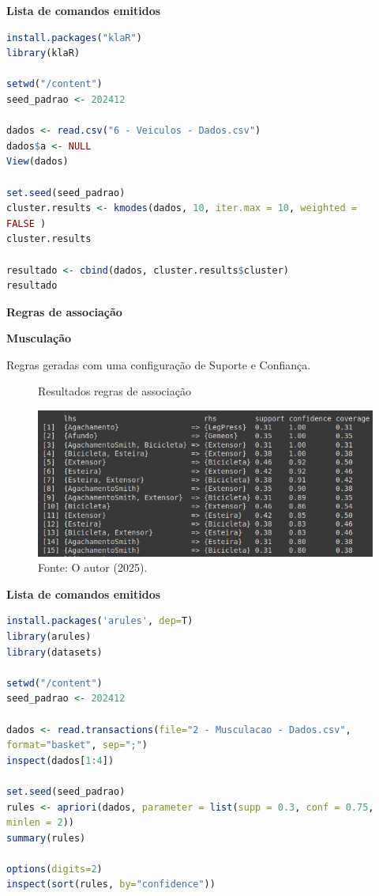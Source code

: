 \begin{center}
    \textbf{Lista de comandos emitidos}
\end{center}


\begin{lstlisting}[language=R, style=input]
install.packages("klaR")
library(klaR)

setwd("/content")
seed_padrao <- 202412

dados <- read.csv("6 - Veiculos - Dados.csv")
dados$a <- NULL
View(dados)

set.seed(seed_padrao)
cluster.results <- kmodes(dados, 10, iter.max = 10, weighted =
FALSE )
cluster.results

resultado <- cbind(dados, cluster.results$cluster)
resultado
\end{lstlisting}


\begin{adjustwidth}{1em}{}
\textbf{Regras de associação}
\end{adjustwidth}

\begin{center}
    \textbf{Musculação}
\end{center}

Regras geradas com uma configuração de Suporte e Confiança.


\begin{figure}[H]
\centering
\caption{Resultados regras de associação}
\includegraphics[width=\linewidth]{apendices/fig/8_IAA008_17.png}
\caption*{Fonte: O autor (2025).}
\end{figure}

\begin{center}
    \textbf{Lista de comandos emitidos}
\end{center}


\begin{lstlisting}[language=R, style=input]
install.packages('arules', dep=T)
library(arules)
library(datasets)

setwd("/content")
seed_padrao <- 202412

dados <- read.transactions(file="2 - Musculacao - Dados.csv",
format="basket", sep=";")
inspect(dados[1:4])

set.seed(seed_padrao)
rules <- apriori(dados, parameter = list(supp = 0.3, conf = 0.75,
minlen = 2))
summary(rules)

options(digits=2)
inspect(sort(rules, by="confidence"))
\end{lstlisting}